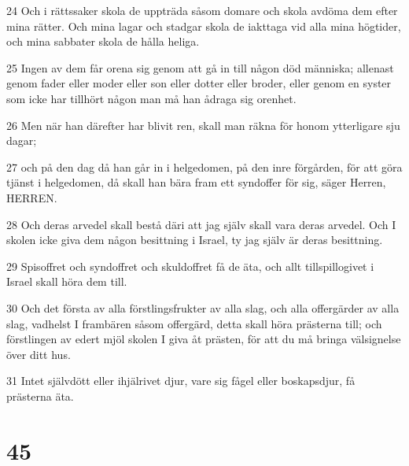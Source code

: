 \par 24 Och i rättssaker skola de uppträda såsom domare och skola avdöma dem efter mina rätter. Och mina lagar och stadgar skola de iakttaga vid alla mina högtider, och mina sabbater skola de hålla heliga.
\par 25 Ingen av dem får orena sig genom att gå in till någon död människa; allenast genom fader eller moder eller son eller dotter eller broder, eller genom en syster som icke har tillhört någon man må han ådraga sig orenhet.
\par 26 Men när han därefter har blivit ren, skall man räkna för honom ytterligare sju dagar;
\par 27 och på den dag då han går in i helgedomen, på den inre förgården, för att göra tjänst i helgedomen, då skall han bära fram ett syndoffer för sig, säger Herren, HERREN.
\par 28 Och deras arvedel skall bestå däri att jag själv skall vara deras arvedel. Och I skolen icke giva dem någon besittning i Israel, ty jag själv är deras besittning.
\par 29 Spisoffret och syndoffret och skuldoffret få de äta, och allt tillspillogivet i Israel skall höra dem till.
\par 30 Och det första av alla förstlingsfrukter av alla slag, och alla offergärder av alla slag, vadhelst I frambären såsom offergärd, detta skall höra prästerna till; och förstlingen av edert mjöl skolen I giva åt prästen, för att du må bringa välsignelse över ditt hus.
\par 31 Intet självdött eller ihjälrivet djur, vare sig fågel eller boskapsdjur, få prästerna äta.

\chapter{45}

